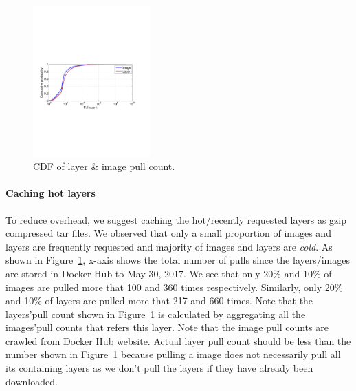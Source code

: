 \begin{figure}
	\centering
	\includegraphics[width=0.4\textwidth]{graphs/pull-cnt.pdf}
	\caption{CDF of layer \& image pull count.
	}
	\label{fig:pull-cnt}
\end{figure}

\paragraph{Caching hot layers}
To reduce overhead, we suggest caching the hot/recently requested layers as
gzip compressed tar files. We observed that only a small proportion of images
and layers are frequently requested and majority of images and layers are
\textit{cold}. As shown in Figure~\ref{fig:pull-cnt}, x-axis shows the total
number of pulls since the layers/images are stored in Docker Hub to May 30,
2017.  We see that only 20\% and 10\% of images are pulled more that 100 and
360 times respectively.  Similarly, only 20\% and 10\% of layers are pulled
more that 217 and 660 times.  Note that the layers'pull count shown in
Figure~\ref{fig:pull-cnt} is calculated by aggregating all the images'pull
counts that refers this layer.  Note that the image pull counts are crawled
from Docker Hub website.  Actual layer pull count should be less than the
number shown in Figure~\ref{fig:pull-cnt} because pulling a image does not
necessarily pull all its containing layers as we don't pull the layers if they
have already been downloaded.

